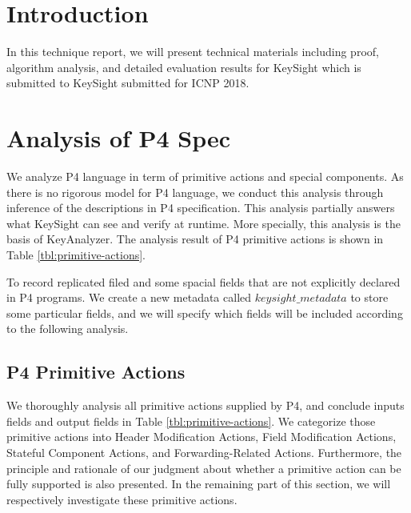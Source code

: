 \section{Introduction}

In this technique report, we will present technical materials including proof, algorithm analysis, and detailed evaluation results for KeySight which is submitted to KeySight submitted for ICNP 2018.




\section{Analysis of P4 Spec}
We analyze P4 \cite{p4} language in term of primitive actions and special components. As there is no rigorous model for P4 language, we conduct this analysis through inference of the descriptions in P4 specification. This analysis partially answers what KeySight can see and verify at runtime. More specially, this analysis is the basis of KeyAnalyzer. The analysis result of P4 primitive actions is shown in Table \ref{tbl:primitive-actions}.

To record replicated filed and some spacial fields that are not explicitly declared in P4 programs. We create a new metadata called $keysight\_metadata$ to store some particular fields, and we will specify which fields will be included according to the following analysis.




\subsection{P4 Primitive Actions}
We thoroughly analysis all primitive actions supplied by P4, and conclude inputs fields and output fields in Table \ref{tbl:primitive-actions}. We categorize those primitive actions into Header Modification Actions, Field Modification Actions, Stateful Component Actions, and Forwarding-Related Actions. Furthermore, the principle and rationale of our judgment about whether a primitive action can be fully supported is also presented. In the remaining part of this section, we will respectively investigate these primitive actions. 


